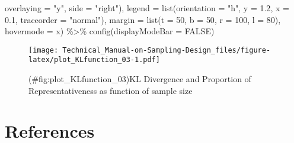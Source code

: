\documentclass[
]{book}
\newenvironment{Shaded}{\begin{snugshade}}{\end{snugshade}}
\newcommand{\AttributeTok}[1]{\textcolor[rgb]{0.77,0.63,0.00}{#1}}
\newcommand{\ConstantTok}[1]{\textcolor[rgb]{0.00,0.00,0.00}{#1}}
\newcommand{\DecValTok}[1]{\textcolor[rgb]{0.00,0.00,0.81}{#1}}
\newcommand{\FloatTok}[1]{\textcolor[rgb]{0.00,0.00,0.81}{#1}}
\newcommand{\FunctionTok}[1]{\textcolor[rgb]{0.00,0.00,0.00}{#1}}
\newcommand{\NormalTok}[1]{#1}
\newcommand{\SpecialCharTok}[1]{\textcolor[rgb]{0.00,0.00,0.00}{#1}}
\newcommand{\StringTok}[1]{\textcolor[rgb]{0.31,0.60,0.02}{#1}}
\begin{document}
\begin{Shaded}
\begin{Highlighting}[]
                       \AttributeTok{overlaying =} \StringTok{"y"}\NormalTok{, }\AttributeTok{side =} \StringTok{"right"}\NormalTok{),}
         \AttributeTok{legend =} \FunctionTok{list}\NormalTok{(}\AttributeTok{orientation =} \StringTok{"h"}\NormalTok{, }\AttributeTok{y =} \FloatTok{1.2}\NormalTok{, }\AttributeTok{x =} \FloatTok{0.1}\NormalTok{,}
                       \AttributeTok{traceorder =} \StringTok{"normal"}\NormalTok{),}
         \AttributeTok{margin =} \FunctionTok{list}\NormalTok{(}\AttributeTok{t =} \DecValTok{50}\NormalTok{, }\AttributeTok{b =} \DecValTok{50}\NormalTok{, }\AttributeTok{r =} \DecValTok{100}\NormalTok{, }\AttributeTok{l =} \DecValTok{80}\NormalTok{),}
         \AttributeTok{hovermode =} \StringTok{\textquotesingle{}x\textquotesingle{}}\NormalTok{)  }\SpecialCharTok{\%\textgreater{}\%} 
  \FunctionTok{config}\NormalTok{(}\AttributeTok{displayModeBar =} \ConstantTok{FALSE}\NormalTok{) }
\end{Highlighting}
\end{Shaded}

\begin{figure}
\centering
\texttt{[image: Technical\_Manual-on-Sampling-Design\_files/figure-latex/plot\_KLfunction\_03-1.pdf]}
\caption{(\#fig:plot\_KLfunction\_03)KL Divergence and Proportion of Representativeness as function of sample size}
\end{figure}

\hypertarget{references}{%
\chapter*{References}\label{references}}

  
\end{document}
